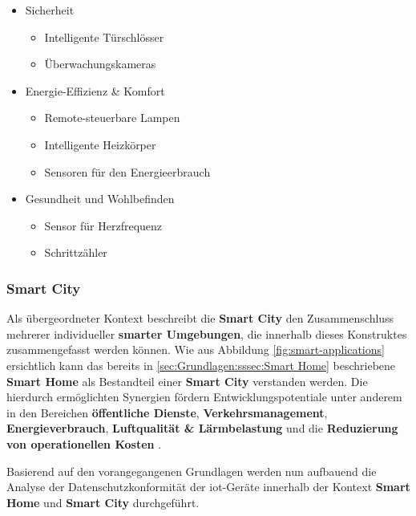 \begin{itemize}
	\item Sicherheit
		\begin{itemize}
			\item Intelligente Türschlösser
			\item Überwachungskameras
		\end{itemize}
	\item Energie-Effizienz \& Komfort
		\begin{itemize}
			\item Remote-steuerbare Lampen
			\item Intelligente Heizkörper
			\item Sensoren für den Energieerbrauch
		\end{itemize}
	\item Gesundheit und Wohlbefinden
		\begin{itemize}
			\item Sensor für Herzfrequenz
			\item Schrittzähler
		\end{itemize}
\end{itemize}

\subsubsection{Smart City}
\label{sec:Grundlagen:ssec:Smarte Kontexte:sssec:Smart City}

Als übergeordneter Kontext beschreibt die \textbf{Smart City} den Zusammenschluss mehrerer individueller \textbf{smarter Umgebungen}, die innerhalb dieses Konstruktes zusammengefasst werden können. Wie aus Abbildung \ref{fig:smart-applications} ersichtlich kann das bereits in  \ref{sec:Grundlagen:sssec:Smart Home} beschriebene \textbf{Smart Home} als Bestandteil einer \textbf{Smart City} verstanden werden. Die hierdurch ermöglichten Synergien fördern Entwicklungspotentiale unter anderem in den Bereichen \textbf{öffentliche Dienste}, \textbf{Verkehrsmanagement}, \textbf{Energieverbrauch}, \textbf{Luftqualität \& Lärmbelastung} und die \textbf{Reduzierung von operationellen Kosten} \cite{Bastos2018}.

Basierend auf den vorangegangenen Grundlagen werden nun aufbauend die Analyse der Datenschutzkonformität der \ac{iot}-Geräte innerhalb der Kontext \textbf{Smart Home} und \textbf{Smart City} durchgeführt.
